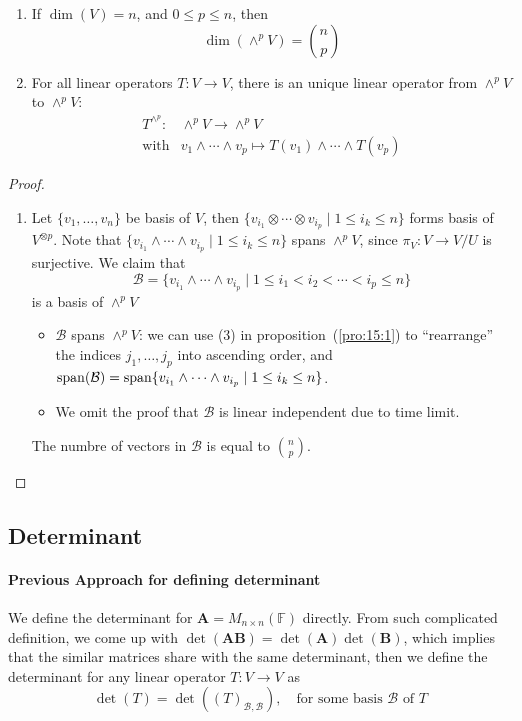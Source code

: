 \begin{proposition}
\begin{enumerate}
\item
If $\dim(V)=n$, and $0\le p\le n$, then
\[
\dim(\wedge^pV)=\binom{n}{p}
\]
\item
For all linear operators $T:V\to V$, there is an unique linear operator
from $\wedge^pV$ to $\wedge^pV$:
\[
\begin{array}{ll}
T^{\wedge^p}:&\wedge^pV\to \wedge^pV\\
\text{with}&v_1\wedge\cdots\wedge v_p\mapsto
T(v_1)\wedge\cdots\wedge T(v_p)
\end{array}
\]
\end{enumerate}
\end{proposition}

\begin{proof}
\begin{enumerate}
\item
Let $\{v_1,\dots,v_n\}$ be basis of $V$, 
then $\{v_{i_1}\otimes\cdots\otimes v_{i_p}\mid 1\le i_{k}\le n\}$ forms basis of $V^{\otimes p}$.
Note that $\{v_{i_1}\wedge\cdots\wedge v_{i_p}\mid 1\le i_{k}\le n\}$ spans $\wedge^pV$, since $\pi_V:V\to V/U$ is surjective.
We claim that
\[
\mathcal{B}=\{v_{i_1}\wedge\cdots\wedge v_{i_p}\mid 1\le i_1<i_2<\cdots<i_p\le n\}
\]
is a basis of $\wedge^pV$
\begin{itemize}
\item
$\mathcal{B}$ spans $\wedge^pV$:
we can use (3) in proposition~(\ref{pro:15:1}) to ``rearrange'' the indices $j_1,\dots,j_p$ into ascending order, and $\operatorname{span}(\mathcal{B})=\operatorname{span}\{v_{i_1}\wedge\cdots\wedge v_{i_p}\mid 1\le i_{k}\le n\}$.
\item
We omit the proof that $\mathcal{B}$ is linear independent due to time limit.
\end{itemize}
The numbre of vectors in $\mathcal{B}$ is equal to $\binom{n}{p}$.

\end{enumerate}
\end{proof}

\subsection{Determinant}
\paragraph{Previous Approach for defining determinant}
We define the determinant for $\bm A = M_{n\times n}(\mathbb{F})$ directly.
From such complicated definition, we come up with $\det(\bm A\bm B)=\det(\bm A)\det(\bm B)$, which implies that the similar matrices share with the same determinant, then we define the determinant for any linear operator $T:V\to V$ as
\[
\det(T) = \det((T)_{\mathcal{B},\mathcal{B}}),\quad
\text{for some basis $\mathcal{B}$ of $T$}
\]

